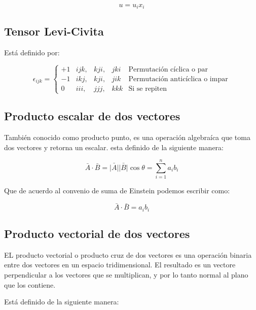 \documentclass{article}
\providecommand{\abs}[1]{\lvert#1\rvert}
\begin{document}
\begin{equation}
    u = u_ix_i
\end{equation}

\subsection{Tensor Levi-Civita}
Está definido por:

\begin{equation}
    \epsilon_{ijk}=
    \left\lbrace\begin{array}{clllr} 
        +1 & ijk, & kji, & jki & \text{Permutación cíclica o par}\\ 
        -1 & ikj, & kji, & jik & \text{Permutación anticíclica o impar}\\
        0  & iii, & jjj, & kkk & \text{Si se repiten}
    \end{array}\right.
\end{equation}

\subsection{Producto escalar de dos vectores}

También conocido como producto punto, es una operación algebraíca que toma dos
vectores y retorna un escalar. esta definido de la siguiente manera:

\begin{equation}
    \bar{A} \cdot \bar{B}= \bar{\abs{A}} \bar{\abs{B}} \cos \theta
    = \sum_{i=1}^{n} a_i b_i
\end{equation}

Que de acuerdo al convenio de suma de Einstein podemos escribir como:

\begin{equation}
    \bar{A} \cdot \bar{B} = a_i b_i
\end{equation}

\subsection{Producto vectorial de dos vectores}

EL producto vectorial o producto cruz de dos vectores es una operación binaria
entre dos vectores en un espacio tridimensional. El resultado es un vectore
perpendicular a los vectores que se multiplican, y por lo tanto normal al plano
que los contiene.

Está definido de la siguiente manera:
\end{document}
